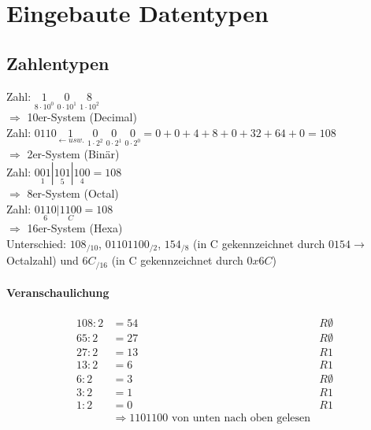 







\maketitle
\newpage
\tableofcontents
\newpage


\section{Eingebaute Datentypen}

\subsection{Zahlentypen}
Zahl: $\underset{8\cdot 10^0}{1} \; \underset{0 \cdot 10^1}{0} \;\underset{1\cdot 10^2}{8}$\\
$\Rightarrow$ 10er-System (Decimal)\\
Zahl: $0110\underset{\leftarrow usw.}{1}\;\underset{1\cdot 2^2}{0}\;\underset{0\cdot 2^1}{0}\;\underset{0\cdot 2^0}{0} = 0 + 0 + 4+8+0+32+64+0 =108$\\
$\Rightarrow$ 2er-System (Binär)\\
Zahl: $\underset{1}{001}|\underset{5}{101}|\underset{4}{100}=108$\\
$\Rightarrow$ 8er-System (Octal)\\
Zahl: $\underset{6}{0110}|\underset{C}{1100}=108$\\
$\Rightarrow$ 16er-System (Hexa)\\
Unterschied: $108_{/10}$, $01101100_{/2}$, $154_{/8}$ (in C gekennzeichnet durch $0154\rightarrow$ Octalzahl) und $6C_{/16}$ (in C gekennzeichnet durch $0x6C$)

\paragraph{Veranschaulichung}
\begin{align*}
108:2&=54 &R \emptyset\\
65:2 &= 27 &R \emptyset\\
27:2&= 13 &R 1\\
13:2 &= 6 &R 1\\
6:2 &=3 &R \emptyset\\
3:2 &= 1 &R 1\\
1:2&= 0 &R 1\\
&\Rightarrow 1101100 \text{ von unten nach oben gelesen}&
\end{align*}

